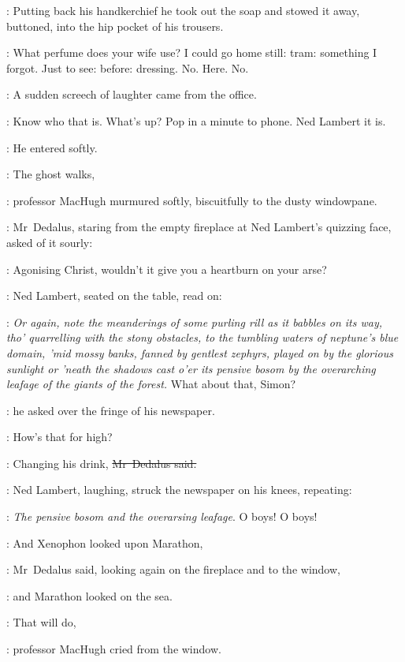 :
Putting back his handkerchief
he took out the soap and stowed it away,
buttoned,
into the hip pocket of his trousers.

\BloomInt:
What perfume does your wife use?
I could go home still:
tram: something I forgot.
Just to see: before:
dressing.
No.
Here.
No.

:
A sudden screech of laughter came from the  office.

\BloomInt:
Know who that is.
What's up?
Pop in a minute to phone.
Ned Lambert it is.

:
He entered softly.



\machugh:
The ghost walks,

:
professor MacHugh murmured softly, biscuitfully
to the dusty windowpane.

:
Mr~Dedalus,
staring from the empty fireplace at Ned Lambert's quizzing face,
asked of it sourly:

\simon:
Agonising Christ,
wouldn't it give you a heartburn on your arse?

:
Ned Lambert, seated on the table, read on:

\lambert:
\emph{%
Or again, note the meanderings of some purling rill
as it babbles on its way,
tho' quarrelling with the stony obstacles,
to the tumbling waters of neptune's blue domain,
'mid mossy banks,
fanned by gentlest zephyrs,
played on by the glorious sunlight
or 'neath the shadows cast o'er its pensive bosom
by the overarching leafage of the giants of the forest.}
What about that, Simon?

:
he asked over the fringe of his newspaper.

\lambert:
How's that for high?

\simon:
Changing his drink,
\sout{Mr~Dedalus said.}

:
Ned Lambert, laughing,
struck the newspaper on his knees,
repeating:

\lambert:
\emph{The pensive bosom and the overarsing leafage}.
O boys!
O boys!

\simon:
And Xenophon looked upon Marathon,

:
Mr~Dedalus said,
looking again on the fireplace and to the window,

\simon:
and Marathon looked on the sea.

\machugh:
That will do,

:
professor MacHugh cried from the window.

